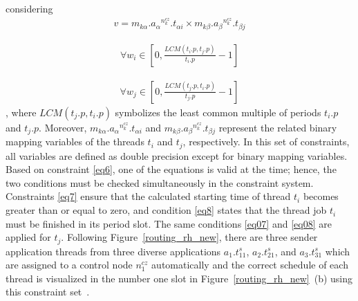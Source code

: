     
    considering
    \begin{equation*}
    	\begin{split}
    	{v} = m_{k \alpha}.{a_\alpha}^{n_k^{cz}}.t_{\alpha i} \times m_{k \beta}.{a_\beta}^{n_k^{cz}}.t_{\beta j}
    	\label{}
    		\end{split}
    \end{equation*} 
    
    \begin{equation*}
    	\begin{split}
    	 \forall{w_i} \in \left[ 0, \frac{LCM ({t_i}.{p}, {t_j}.{p})}{{t_i}.{p}} - 1 \right]   
    	\label{}
    		\end{split}
    \end{equation*}
    
    
    \begin{equation*}
    	\begin{split}
    	\forall{w_j} \in \left[ 0, \frac{LCM ({t_j}.{p}, {t_i}.{p})}{{t_j}.{p}} - 1 \right] 
    	\label{}
    		\end{split}
    \end{equation*}\newline
    , where $LCM ({t_j}.{p}, {t_i}.{p})$ symbolizes the least common multiple of periods ${t_i}.{p}$ and ${t_j}.{p}$. Moreover, $m_{k\alpha}.{a_\alpha}^{n_k^{cz}}.t_{\alpha i}$ and $m_{k \beta}.{a_\beta}^{n_k^{cz}}.t_{\beta j}$ represent the related binary mapping variables of the threads $t_i$ and $t_j$, respectively. In this set of constraints, all variables are defined as double precision except for binary mapping variables. Based on constraint \eqref{eq6}, one of the equations is valid at the time; hence, the two conditions must be checked simultaneously in the constraint system. Constraints \eqref{eq7} ensure that the calculated starting time of thread $t_i$ becomes greater than or equal to zero, and condition \eqref{eq8} states that the thread job $t_i$ must be finished in its period slot. The same conditions \eqref{eq07} and \eqref{eq08} are applied for $t_j$. Following Figure~\ref{routing_rh_new}, there are three sender application threads from three diverse applications $a_1.t_{11}^{s}$, $a_2.t_{21}^{s}$, and $a_3.t_{31}^{s}$ which are assigned to a control node $n_{1}^{cz}$ automatically and the correct schedule of each thread is visualized in the number one slot in Figure~\ref{routing_rh_new}~(b) using this constraint set~\cite{askaripoor2023designer}.  
             

